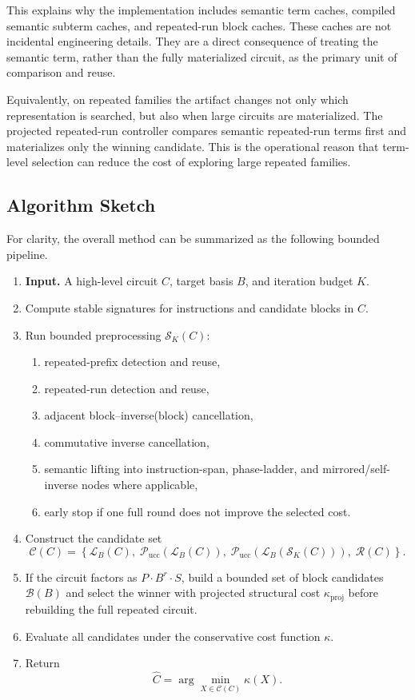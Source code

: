 \documentclass[11pt]{article}
\begin{document}
This explains why the implementation includes semantic term caches, compiled
semantic subterm caches, and repeated-run block caches. These caches are not
incidental engineering details. They are a direct consequence of treating the
semantic term, rather than the fully materialized circuit, as the primary unit
of comparison and reuse.

Equivalently, on repeated families the artifact changes not only which
representation is searched, but also when large circuits are materialized. The
projected repeated-run controller compares semantic repeated-run terms first and
materializes only the winning candidate. This is the operational reason that
term-level selection can reduce the cost of exploring large repeated families.

\subsection{Algorithm Sketch}

For clarity, the overall method can be summarized as the following bounded pipeline.

\begin{enumerate}[leftmargin=1.8em]
    \item \textbf{Input.} A high-level circuit $C$, target basis $B$, and iteration budget $K$.
    \item Compute stable signatures for instructions and candidate blocks in $C$.
    \item Run bounded preprocessing $\mathcal{S}_K(C)$:
    \begin{enumerate}[leftmargin=1.5em]
    \item repeated-prefix detection and reuse,
    \item repeated-run detection and reuse,
    \item adjacent block--inverse(block) cancellation,
    \item commutative inverse cancellation,
    \item semantic lifting into instruction-span, phase-ladder, and mirrored/self-inverse nodes where applicable,
    \item early stop if one full round does not improve the selected cost.
    \end{enumerate}
    \item Construct the candidate set
    \[
    \mathcal{C}(C) =
    \left\{
    \mathcal{L}_B(C),\;
    \mathcal{P}_{\mathrm{ucc}}(\mathcal{L}_B(C)),\;
    \mathcal{P}_{\mathrm{ucc}}(\mathcal{L}_B(\mathcal{S}_K(C))),\;
    \mathcal{R}(C)
    \right\}.
    \]
    \item If the circuit factors as $P \cdot B^r \cdot S$, build a bounded set of block candidates $\mathcal{B}(B)$ and select the winner with projected structural cost $\kappa_{\mathrm{proj}}$ before rebuilding the full repeated circuit.
    \item Evaluate all candidates under the conservative cost function $\kappa$.
    \item Return
    \[
    \widehat{C} = \arg\min_{X \in \mathcal{C}(C)} \kappa(X).
    \]
\end{enumerate}
\end{document}
